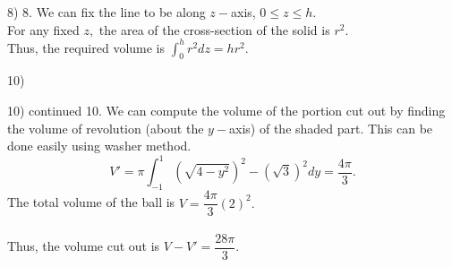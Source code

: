 \documentclass[handout]{beamer}
\begin{document}


\begin{frame}{8)}
	8. We can fix the line to be along $z-$axis, $0 \le z \le h.$\\
	For any fixed $z,$ the area of the cross-section of the solid is $r^2.$\\
	Thus, the required volume is $\displaystyle\int_{0}^{h} r^2 dz = hr^2.$
\end{frame}



\begin{frame}{10)}
	\begin{figure}[h]
		\centering
	\end{figure}
\end{frame}
\begin{frame}{10) continued}
	10. We can compute the volume of the portion cut out by finding the volume of revolution (about the $y-$axis) of the shaded part. This can be done easily using washer method.\\
	\[V' = \pi\int_{-1}^{1} \left(\sqrt{4 - y^2}\right)^2 - \left(\sqrt{3}\right)^2 dy = \frac{4\pi}{3}. \]
	The total volume of the ball is $V = \dfrac{4\pi}{3}(2)^2.$\\~\\
	Thus, the volume cut out is $V - V' = \dfrac{28\pi}{3}.$
\end{frame}
\end{document}
